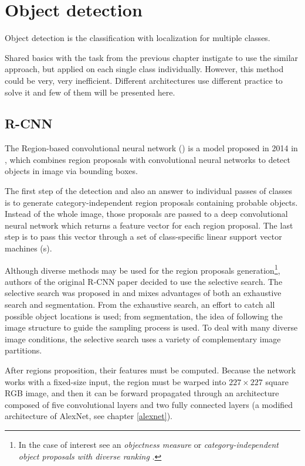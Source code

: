 \section{Object detection}
\label{object-detection}

Object detection is the classification with localization for multiple classes.

Shared basics with the task from the previous chapter instigate to use the 
similar approach, but applied on each single class individually. However, this 
method could be very, very inefficient. Different architectures use different 
practice to solve it and few of them will be presented here.

\subsection{R-CNN}
\label{r-cnn}

The Region-based convolutional neural network () is a model proposed 
in 2014 in \cite{rcnn}, which combines region proposals with convolutional 
neural networks to detect objects in image via bounding boxes. 

The first step of the detection and also an answer to individual passes of 
classes is to generate category-independent region proposals containing probable 
objects. Instead of the whole image, those proposals are passed to a deep 
convolutional neural network which returns a feature vector for each region 
proposal. The last step is to pass this vector through a set of class-specific 
linear support vector machines (s).

Although diverse methods may be used for the region proposals 
generation\footnote{In the case of interest see an \textit{objectness measure} 
\cite{objectness} or \textit{category-independent object proposals with diverse 
ranking} \cite{cat-independent-proposals}.}, authors of the original R-CNN paper 
decided to use the selective search. The selective search was proposed in 
\cite{selective-search} and mixes advantages of both an exhaustive search and 
segmentation. From the exhaustive search, an effort to catch all possible object 
locations is used; from segmentation, the idea of following the image structure 
to guide the sampling process is used. To deal with many diverse image 
conditions, the selective search uses a variety of complementary image 
partitions.

After regions proposition, their features must be computed. Because the network 
works with a fixed-size input, the region must be warped into $227 \times 227$ 
square RGB image, and then it can be forward propagated through an architecture 
composed of five convolutional layers and two fully connected layers (a modified 
architecture of AlexNet, see chapter \ref{alexnet}).

